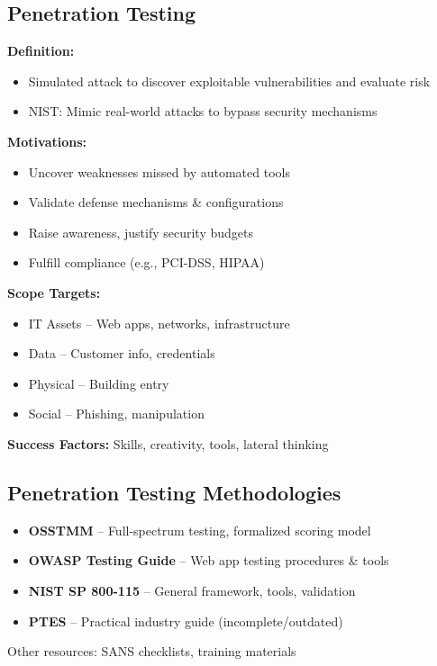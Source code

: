 \subsection{Penetration Testing}
{
\textbf{Definition:}
\begin{itemize}[noitemsep]
  \item Simulated attack to discover exploitable vulnerabilities and evaluate risk
  \item NIST: Mimic real-world attacks to bypass security mechanisms
\end{itemize}

\textbf{Motivations:}
\begin{itemize}[noitemsep]
  \item Uncover weaknesses missed by automated tools
  \item Validate defense mechanisms \& configurations
  \item Raise awareness, justify security budgets
  \item Fulfill compliance (e.g., PCI-DSS, HIPAA)
\end{itemize}

\textbf{Scope Targets:}
\begin{itemize}[noitemsep]
  \item IT Assets – Web apps, networks, infrastructure
  \item Data – Customer info, credentials
  \item Physical – Building entry
  \item Social – Phishing, manipulation
\end{itemize}

\textbf{Success Factors:} Skills, creativity, tools, lateral thinking
}

\subsection{Penetration Testing Methodologies}
{
\begin{itemize}[noitemsep]
  \item \textbf{OSSTMM} – Full-spectrum testing, formalized scoring model
  \item \textbf{OWASP Testing Guide} – Web app testing procedures \& tools
  \item \textbf{NIST SP 800-115} – General framework, tools, validation
  \item \textbf{PTES} – Practical industry guide (incomplete/outdated)
\end{itemize}

Other resources: SANS checklists, training materials
}

